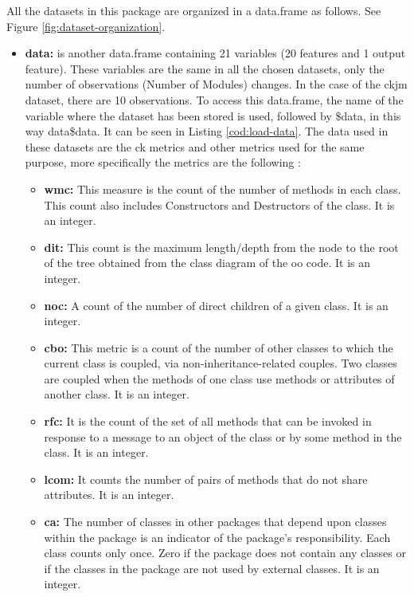 All the datasets in this package are organized in a data.frame as follows. See Figure \ref{fig:dataset-organization}.
\begin{itemize}
    \item \textbf{data:} is another data.frame containing 21 variables (20 features and 1 output feature). These variables are the same in all the chosen datasets, only the number of observations (Number of Modules) changes. In the case of the ckjm dataset, there are 10 observations. To access this data.frame, the name of the variable where the dataset has been stored is used, followed by \$data, in this way data\$data. It can be seen in Listing \ref{cod:load-data}. The data used in these datasets are the \acrshort{ck} metrics and other metrics used for the same purpose, more specifically the metrics are the following \cite{metrics2013}:
    \begin{itemize}
        \item \textbf{\acrshort{wmc}:} This measure is the count of the number of methods in each class. This count also includes Constructors and Destructors of the class. It is an integer.
        
        \item \textbf{\acrshort{dit}:} This count is the maximum length/depth from the node to the root of the tree obtained from the class diagram of the \acrshort{oo} code. It is an integer.
        
        \item \textbf{\acrshort{noc}:} A count of the number of direct children of a given class. It is an integer.
        
        \item \textbf{\acrshort{cbo}:} This metric is a count of the number of other classes to which the current class is coupled, via non-inheritance-related couples. Two classes are coupled when the methods of one class use methods or attributes of another class.  It is an integer.
        
        \item \textbf{\acrshort{rfc}:} It is the count of the set of all methods that can be invoked in response to a message to an object of the class or by some method in the class. It is an integer.
        
        \item \textbf{\acrshort{lcom}:} It counts the number of pairs of methods that do not share attributes. It is an integer.
        
        \item \textbf{\acrshort{ca}:} The number of classes in other packages that depend upon classes within the package is an indicator of the package's responsibility. Each class counts only once. Zero if the package does not contain any classes or if the classes in the package are not used by external classes. It is an integer. 
        

\end{itemize}
\end{itemize}
